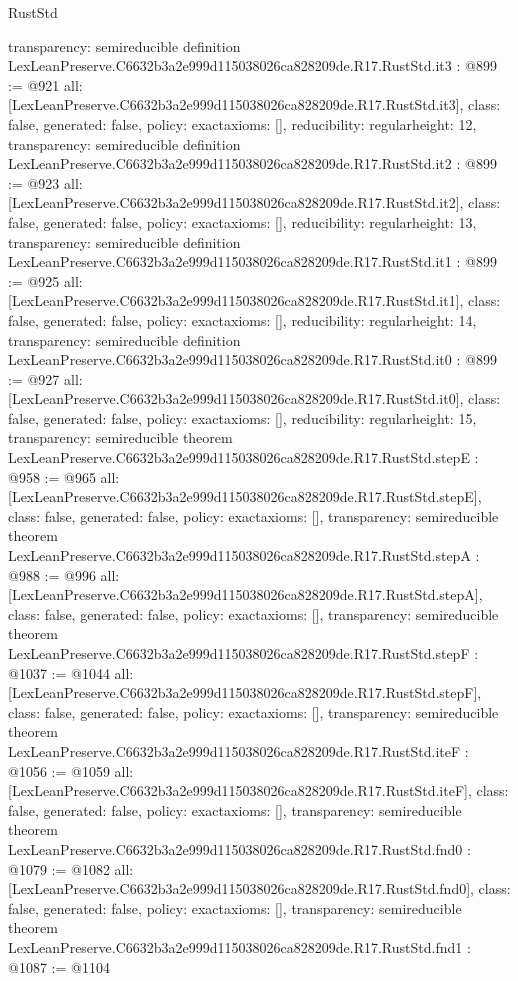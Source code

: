 \begin{lexlean}{RustStd}
\begin{coremodule}
{  transparency: semireducible
}
definition LexLeanPreserve.C6632b3a2e999d115038026ca828209de.R17.RustStd.it3 : @899 := @921 {
  all: [LexLeanPreserve.C6632b3a2e999d115038026ca828209de.R17.RustStd.it3],
  class: false,
  generated: false,
  policy: exact{axioms: []},
  reducibility: regular{height: 12},
  transparency: semireducible
}
definition LexLeanPreserve.C6632b3a2e999d115038026ca828209de.R17.RustStd.it2 : @899 := @923 {
  all: [LexLeanPreserve.C6632b3a2e999d115038026ca828209de.R17.RustStd.it2],
  class: false,
  generated: false,
  policy: exact{axioms: []},
  reducibility: regular{height: 13},
  transparency: semireducible
}
definition LexLeanPreserve.C6632b3a2e999d115038026ca828209de.R17.RustStd.it1 : @899 := @925 {
  all: [LexLeanPreserve.C6632b3a2e999d115038026ca828209de.R17.RustStd.it1],
  class: false,
  generated: false,
  policy: exact{axioms: []},
  reducibility: regular{height: 14},
  transparency: semireducible
}
definition LexLeanPreserve.C6632b3a2e999d115038026ca828209de.R17.RustStd.it0 : @899 := @927 {
  all: [LexLeanPreserve.C6632b3a2e999d115038026ca828209de.R17.RustStd.it0],
  class: false,
  generated: false,
  policy: exact{axioms: []},
  reducibility: regular{height: 15},
  transparency: semireducible
}
theorem LexLeanPreserve.C6632b3a2e999d115038026ca828209de.R17.RustStd.stepE : @958 := @965 {
  all: [LexLeanPreserve.C6632b3a2e999d115038026ca828209de.R17.RustStd.stepE],
  class: false,
  generated: false,
  policy: exact{axioms: []},
  transparency: semireducible
}
theorem LexLeanPreserve.C6632b3a2e999d115038026ca828209de.R17.RustStd.stepA : @988 := @996 {
  all: [LexLeanPreserve.C6632b3a2e999d115038026ca828209de.R17.RustStd.stepA],
  class: false,
  generated: false,
  policy: exact{axioms: []},
  transparency: semireducible
}
theorem LexLeanPreserve.C6632b3a2e999d115038026ca828209de.R17.RustStd.stepF : @1037 := @1044 {
  all: [LexLeanPreserve.C6632b3a2e999d115038026ca828209de.R17.RustStd.stepF],
  class: false,
  generated: false,
  policy: exact{axioms: []},
  transparency: semireducible
}
theorem LexLeanPreserve.C6632b3a2e999d115038026ca828209de.R17.RustStd.iteF : @1056 := @1059 {
  all: [LexLeanPreserve.C6632b3a2e999d115038026ca828209de.R17.RustStd.iteF],
  class: false,
  generated: false,
  policy: exact{axioms: []},
  transparency: semireducible
}
theorem LexLeanPreserve.C6632b3a2e999d115038026ca828209de.R17.RustStd.fnd0 : @1079 := @1082 {
  all: [LexLeanPreserve.C6632b3a2e999d115038026ca828209de.R17.RustStd.fnd0],
  class: false,
  generated: false,
  policy: exact{axioms: []},
  transparency: semireducible
}
theorem LexLeanPreserve.C6632b3a2e999d115038026ca828209de.R17.RustStd.fnd1 : @1087 := @1104 {
}
\end{coremodule}
\end{lexlean}
